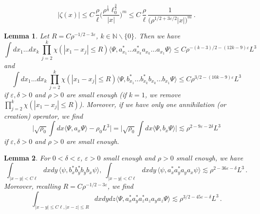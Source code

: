 \documentclass[10pt,a4paper]{amsart}
\newtheorem{lemma}{Lemma}
\def\bN{\mathbb{N}}
\def\eps{\varepsilon}
\begin{document}
\begin{equation}
            \label{eq:decay}
 |\zeta(x)|  \leq C \, \frac{\rho}{\ell}\Big( \frac{\rho^{\frac{1}{4}}\ell_0^{\frac{3}{2}}}{|x|}\Big)^m \leq C \, \frac{\rho}{\ell} \, \frac{1}{\big( \rho^{1/2+3\eps/2} |x| \big)^{m}} \,.
\end{equation}

\begin{lemma} \label{lm:a-bds} 
Let $R = C \rho^{-1/2-3\eps}$, $k \in \bN \backslash \{ 0 \}$. Then we have 
\begin{equation}\label{eq:kas}  \int dx_1 \dots dx_k \, \prod_{j=2}^k \chi (|x_1 - x_j| \leq R)  \langle \Psi, a_{x_1}^* \dots a_{x_k}^* a_{x_k} \dots a_{x_1} \Psi \rangle \leq C \rho^{-(k-3)/2 - (12 k -9) \eps} L^3 \end{equation} 
and 
\begin{equation}\label{eq:kbs}  \int dx_1 \dots dx_k \, \prod_{j=2}^k \chi (|x_1 - x_j| \leq R)  \langle \Psi, b_{x_1}^* \dots b_{x_k}^* b_{x_k} \dots b_{x_1} \Psi \rangle \leq C \rho^{3/2 - (10k -9) \eps} L^3 \end{equation} 
if $\eps, \delta > 0$ and $\rho > 0$ are small enough (if $k=1$, we remove $\prod_{j=2}^k \chi (|x_1 - x_j| \leq R)$). Moreover, if we have only one annihilation (or creation) operator, we find \begin{equation}\label{eq:1bb} \Big| \sqrt{\rho_0} \int dx\langle \Psi, a_x \Psi \rangle - \rho_0 L^3 \Big| = \Big| \sqrt{\rho_0} \int dx \langle \Psi, b_x \Psi \rangle \Big| \lesssim \rho^{2-9\eps-2\delta} L^3 \end{equation} 
if $\eps, \delta > 0$ and $\rho >0$ are small enough. 
\end{lemma} 

\begin{lemma} \label{lm:aaaaC} 
For $0 < \delta < \eps$, $\eps > 0$ small enough and $\rho > 0$ small enough, we have 
\begin{equation}\label{eq:aaaaC} \int_{|x-y| < C \ell} dx dy \, \langle \psi, b_x^* b_y^* b_y b_x \psi \rangle , \; \int_{|x-y| < C \ell} dx dy \, \langle \psi, a_x^* a_y^* a_y a_x \psi \rangle  \lesssim \rho^{2-36\eps-\delta} L^3\,. \end{equation} 
Moreover, recalling $R = C \rho^{-1/2-3\eps}$, we find  
\begin{equation}\label{eq:aaaCR} \int_{|x-y| \leq C \ell, |x-z| \leq R} dx dy dz \langle \Psi, a_x^* a_y^* a_z^* a_z a_y a_z \Psi \rangle \lesssim \rho^{3/2-45\eps-\delta} L^3\,. \end{equation}
\end{lemma} 
\end{document}
